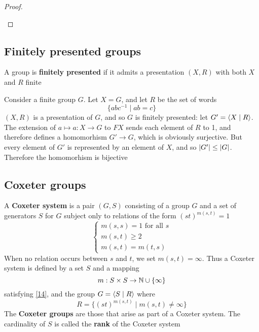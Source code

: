 \documentclass[11pt]{article}
\begin{document}
\begin{proof}
\begin{center}\end{center}
\end{proof}
\subsection{Finitely presented groups}
\label{sec:org7fa0133}

A group is \textbf{finitely presented} if it admits a presentation \((X,R)\) with both \(X\) and \(R\)
finite

\begin{examplle}[]
Consider a finite group \(G\). Let \(X=G\), and let \(R\) be the set of words
\begin{equation*}
\{abc^{-1}\mid ab=c\}
\end{equation*}
\((X,R)\) is a presentation of \(G\), and so \(G\) is finitely presented: let \(G'=\langle X\mid R\rangle\).
The extension of \(a\mapsto a:X\to G\) to \(FX\) sends each element of \(R\) to 1, and therefore defines
a homomorhism \(G'\to G\), which is obviously surjective. But every element of \(G'\) is
represented by an element of \(X\), and so \(\abs{G'}\le\abs{G}\). Therefore the homomorhism is bijective
\end{examplle}
\subsection{Coxeter groups}
\label{sec:orga351bc7}
A \textbf{Coxeter system} is a pair \((G,S)\) consisting of a group \(G\) and a set of generators \(S\)
for \(G\) subject only to relations of the form \((st)^{m(s,t)}=1\)
\begin{equation}
\label{14}
\begin{cases}
m(s,s)=1\text{ for all }s\\
m(s,t)\ge 2\\
m(s,t)=m(t,s)
\end{cases}
\end{equation}
When no relation occurs between \(s\) and \(t\), we set \(m(s,t)=\infty\). Thus a Coxeter system is
defined by a set \(S\) and a mapping
\begin{equation*}
m:S\times S\to\mathbb{N}\cup\{\infty\}
\end{equation*}
satisfying \eqref{14}, and the group \(G=\langle S\mid R\rangle\) where
\begin{equation*}
R=\{(st)^{m(s,t)}\mid m(s,t)\neq\infty\}
\end{equation*}
The \textbf{Coxeter groups} are those that arise as part of a Coxeter system. The cardinality of \(S\) is
called the \textbf{rank} of the Coxeter system
\end{document}
